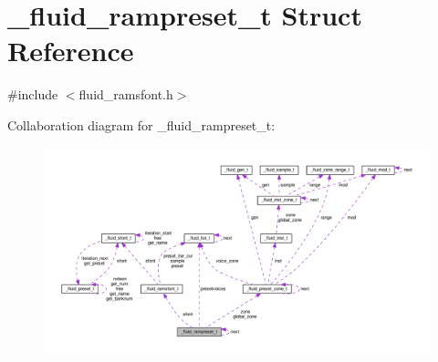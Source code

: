\hypertarget{struct__fluid__rampreset__t}{}\section{\+\_\+fluid\+\_\+rampreset\+\_\+t Struct Reference}
\label{struct__fluid__rampreset__t}


{\ttfamily \#include $<$fluid\+\_\+ramsfont.\+h$>$}



Collaboration diagram for \+\_\+fluid\+\_\+rampreset\+\_\+t\+:
\nopagebreak
\begin{figure}[H]
\begin{center}
\leavevmode
\includegraphics[width=350pt]{struct__fluid__rampreset__t__coll__graph}
\end{center}
\end{figure}
